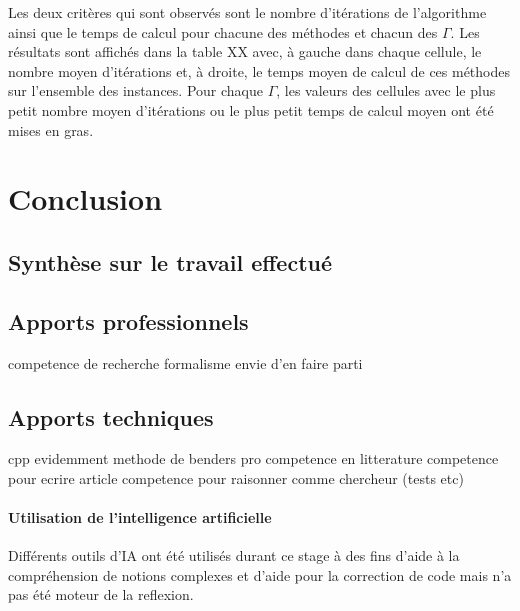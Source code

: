 \documentclass[12pt, a4paper, twoside]{report}
\numberwithin{equation}{section}
\begin{document}
\begin{Figure}[H]
	Les deux critères qui sont observés sont le nombre d'itérations de l'algorithme ainsi que le temps de calcul pour chacune des méthodes et chacun des $\Gamma$. Les résultats sont affichés dans la table XX avec, à gauche dans chaque cellule, le nombre moyen d'itérations et, à droite, le temps moyen de calcul de ces méthodes sur l'ensemble des instances. Pour chaque $\Gamma$, les valeurs des cellules avec le plus petit nombre moyen d'itérations ou le plus petit temps de calcul moyen ont été mises en gras.
	
	\clearpage
	\section{Conclusion}
	
	
	\subsection{Synthèse sur le travail effectué}
	
	
	\subsection{Apports professionnels}
	competence de recherche
    formalisme
    envie d'en faire parti
    
	
	\subsection{Apports techniques}
	cpp evidemment
    methode de benders
    pro
    competence en litterature
    competence pour ecrire article
    competence pour raisonner comme chercheur (tests etc)
    
	
	
	\vfill{}
	\paragraph{Utilisation de l'intelligence artificielle} Différents outils d'IA ont été utilisés durant ce stage à des fins d'aide à la compréhension de notions complexes et d'aide pour la correction de code mais n'a pas été moteur de la reflexion. 
	
	
	

\end{Figure}
\end{document}
